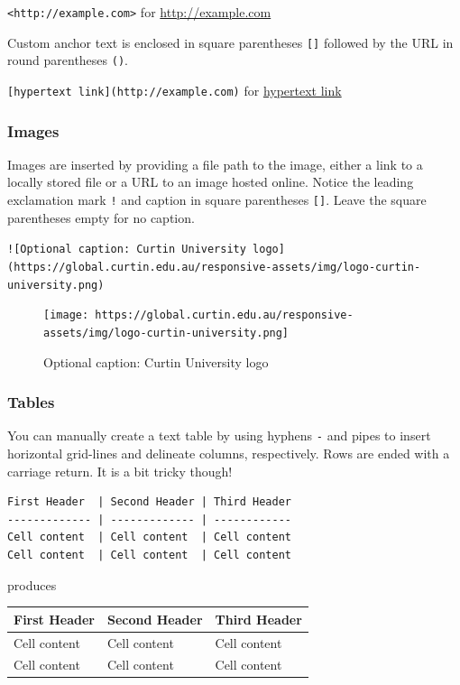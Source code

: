 \documentclass[]{article}
\begin{document}
\texttt{\textless{}http://example.com\textgreater{}} for
\url{http://example.com}

Custom anchor text is enclosed in square parentheses \texttt{{[}{]}}
followed by the URL in round parentheses \texttt{()}.

\texttt{{[}hypertext\ link{]}(http://example.com)} for
\href{http://example.com}{hypertext link}

\hypertarget{images}{%
\subsubsection{Images}\label{images}}

Images are inserted by providing a file path to the image, either a link
to a locally stored file or a URL to an image hosted online. Notice the
leading exclamation mark \texttt{!} and caption in square parentheses
\texttt{{[}{]}}. Leave the square parentheses empty for no caption.

\texttt{!{[}Optional\ caption:\ Curtin\ University\ logo{]}(https://global.curtin.edu.au/responsive-assets/img/logo-curtin-university.png)}

\begin{figure}
\centering
\texttt{[image: https://global.curtin.edu.au/responsive-assets/img/logo-curtin-university.png]}
\caption{Optional caption: Curtin University logo}
\end{figure}

\hypertarget{tables}{%
\subsubsection{Tables}\label{tables}}

You can manually create a text table by using hyphens \texttt{-} and
pipes \texttt{\textbar{}} to insert horizontal grid-lines and delineate
columns, respectively. Rows are ended with a carriage return. It is a
bit tricky though!

\begin{verbatim}
First Header  | Second Header | Third Header
------------- | ------------- | ------------
Cell content  | Cell content  | Cell content
Cell content  | Cell content  | Cell content
\end{verbatim}

produces

\begin{longtable}[]{@{}lll@{}}
\toprule
First Header & Second Header & Third Header\tabularnewline
\midrule
\endhead
Cell content & Cell content & Cell content\tabularnewline
Cell content & Cell content & Cell content\tabularnewline
\bottomrule
\end{longtable}
\end{document}
